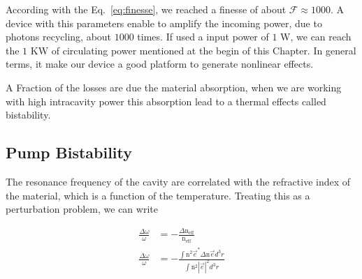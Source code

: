 According with the Eq.~\ref{eq:finesse}, we reached a finesse of about $\mathcal{F} \approx 1000$. A device with this parameters enable to amplify the incoming power, due to photons recycling, about $1000$ times. If used a input power of $1$ W, we can reach the $1$ KW of circulating power mentioned at the begin of this Chapter. In general terms, it make our device a good platform to generate nonlinear effects. 

A Fraction of the losses are due the material absorption, when we are working with high intracavity power this absorption lead to a thermal effects called bistability. 

\subsection{Pump Bistability}
The resonance frequency of the cavity are correlated with the refractive index of the material, which is a function of the temperature. Treating this as a perturbation problem, we can write 

\begin{subequations}
    \begin{alignat}{2}
        \frac{\Delta\omega}{\omega} &= -\frac{\Delta \text{n}_\text{eff}}{\text{n}_\text{eff}}\\
        \frac{\Delta\omega}{\omega} &= -\frac{\int \text{n}^2\vec{e}^*\Delta\text{n}\vec{e} d^3r}
        {\int \text{n}^2 |\vec{e}|^2 d^3r}
    \end{alignat}
\end{subequations}








